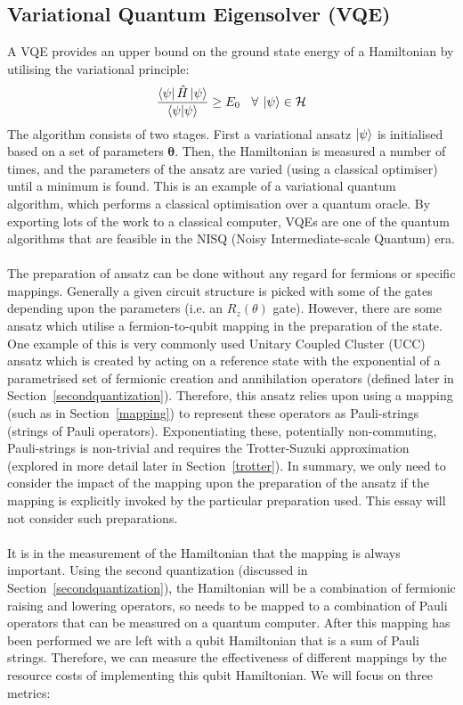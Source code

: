 \documentclass[twoside]{article}
\begin{document}
\subsection{Variational Quantum Eigensolver (VQE)}\label{vqe_section}
A VQE provides an upper bound on the ground state energy of a Hamiltonian by utilising the variational principle:
\begin{equation}
        \frac{\bra{\psi} \hat H \ket{\psi}}{\braket{\psi | \psi}} \geq E_0 \>\>\>\> \forall \> \ket{\psi}\in \mathcal{H}
\end{equation}
The algorithm consists of two stages. First a variational ansatz $\ket{\psi}$ is initialised based on a set of parameters $\bm \theta$. Then, the Hamiltonian is measured a number of times, and the parameters of the ansatz are varied (using a classical optimiser) until a minimum is found. This is an example of a variational quantum algorithm, which performs a classical optimisation over a quantum oracle. By exporting lots of the work to a classical computer, VQEs are one of the quantum algorithms that are feasible in the NISQ (Noisy Intermediate-scale Quantum) era.\\\\ 
The preparation of ansatz can be done without any regard for fermions or specific mappings. Generally a given circuit structure is picked with some of the gates depending upon the parameters (i.e. an $R_z(\theta)$ gate). However, there are some ansatz which utilise a fermion-to-qubit mapping in the preparation of the state. One example of this is very commonly used Unitary Coupled Cluster (UCC) ansatz which is created by acting on a reference state with the exponential of a parametrised set of fermionic creation and annihilation operators (defined later in Section~\ref{secondquantization}). Therefore, this ansatz relies upon using a mapping (such as in Section~\ref{mapping}) to represent these operators as Pauli-strings (strings of Pauli operators). Exponentiating these, potentially non-commuting, Pauli-strings is non-trivial and requires the Trotter-Suzuki approximation (explored in more detail later in Section~\ref{trotter}). In summary, we only need to consider the impact of the mapping upon the preparation of the ansatz if the mapping is explicitly invoked by the particular preparation used. This essay will not consider such preparations.\\\\
It is in the measurement of the Hamiltonian that the mapping is always important. Using the second quantization (discussed in Section~\ref{secondquantization}), the Hamiltonian will be a combination of fermionic raising and lowering operators, so needs to be mapped to a combination of Pauli operators that can be measured on a quantum computer. After this mapping has been performed we are left with a qubit Hamiltonian that is a sum of Pauli strings. Therefore, we can measure the effectiveness of different mappings by the resource costs of implementing this qubit Hamiltonian. We will focus on three metrics:
\end{document}
